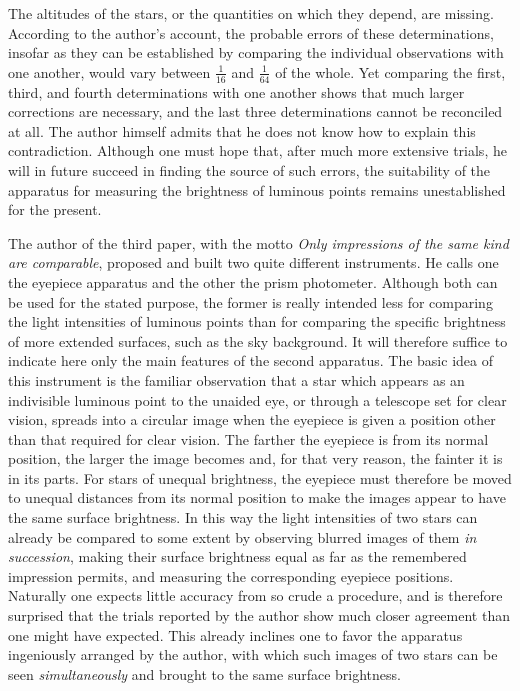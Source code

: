 The altitudes of the stars, or the quantities on which they depend, are missing. According to the author's account, the probable errors of these determinations, insofar as they can be established by comparing the individual observations with one another, would vary between $\frac{1}{16}$ and $\frac{1}{64}$ of the whole. Yet comparing the first, third, and fourth determinations with one another shows that much larger corrections are necessary, and the last three determinations cannot be reconciled at all. The author himself admits that he does not know how to explain this contradiction. Although one must hope that, after much more extensive trials, he will in future succeed in finding the source of such errors, the suitability of the apparatus for measuring the brightness of luminous points remains unestablished for the present.

The author of the third paper, with the motto \emph{Only impressions of the same kind are comparable}, proposed and built two quite different instruments. He calls one the eyepiece apparatus and the other the prism photometer. Although both can be used for the stated purpose, the former is really intended less for comparing the light intensities of luminous points than for comparing the specific brightness of more extended surfaces, such as the sky background. It will therefore suffice to indicate here only the main features of the second apparatus. The basic idea of this instrument is the familiar observation that a star which appears as an indivisible luminous point to the unaided eye, or through a telescope set for clear vision, spreads into a circular image when the eyepiece is given a position other than that required for clear vision. The farther the eyepiece is from its normal position, the larger the image becomes and, for that very reason, the fainter it is in its parts. For stars of unequal brightness, the eyepiece must therefore be moved to unequal distances from its normal position to make the images appear to have the same surface brightness. In this way the light intensities of two stars can already be compared to some extent by observing blurred images of them \emph{in succession}, making their surface brightness equal as far as the remembered impression permits, and measuring the corresponding eyepiece positions. Naturally one expects little accuracy from so crude a procedure, and is therefore surprised that the trials reported by the author show much closer agreement than one might have expected. This already inclines one to favor the apparatus ingeniously arranged by the author, with which such images of two stars can be seen \emph{simultaneously} and brought to the same surface brightness.

